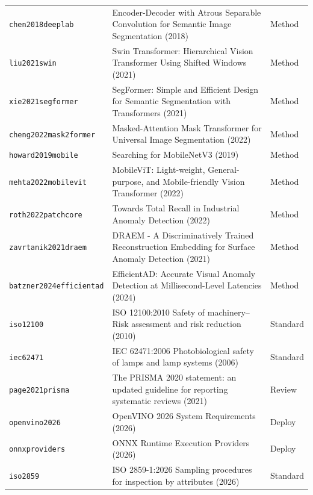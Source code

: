 \begin{longtable}{>{\raggedright\arraybackslash}p{}>{\raggedright\arraybackslash}p{}>{\raggedright\arraybackslash}p{}}
\texttt{chen2018deeplab} & Encoder-Decoder with Atrous Separable Convolution for Semantic Image Segmentation (2018) & Method \\
\texttt{liu2021swin} & Swin Transformer: Hierarchical Vision Transformer Using Shifted Windows (2021) & Method \\
\texttt{xie2021segformer} & SegFormer: Simple and Efficient Design for Semantic Segmentation with Transformers (2021) & Method \\
\texttt{cheng2022mask2former} & Masked-Attention Mask Transformer for Universal Image Segmentation (2022) & Method \\
\texttt{howard2019mobile} & Searching for MobileNetV3 (2019) & Method \\
\texttt{mehta2022mobilevit} & MobileViT: Light-weight, General-purpose, and Mobile-friendly Vision Transformer (2022) & Method \\
\texttt{roth2022patchcore} & Towards Total Recall in Industrial Anomaly Detection (2022) & Method \\
\texttt{zavrtanik2021draem} & DRAEM - A Discriminatively Trained Reconstruction Embedding for Surface Anomaly Detection (2021) & Method \\
\texttt{batzner2024efficientad} & EfficientAD: Accurate Visual Anomaly Detection at Millisecond-Level Latencies (2024) & Method \\
\texttt{iso12100} & ISO 12100:2010 Safety of machinery--Risk assessment and risk reduction (2010) & Standard \\
\texttt{iec62471} & IEC 62471:2006 Photobiological safety of lamps and lamp systems (2006) & Standard \\
\texttt{page2021prisma} & The PRISMA 2020 statement: an updated guideline for reporting systematic reviews (2021) & Review \\
\texttt{openvino2026} & OpenVINO 2026 System Requirements (2026) & Deploy \\
\texttt{onnxproviders} & ONNX Runtime Execution Providers (2026) & Deploy \\
\texttt{iso2859} & ISO 2859-1:2026 Sampling procedures for inspection by attributes (2026) & Standard \\
\bottomrule
\end{longtable}
\endgroup

